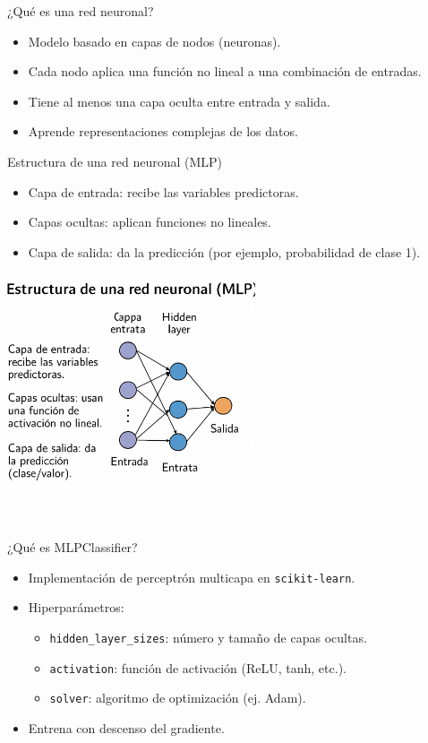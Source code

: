 \documentclass{beamer}
\begin{document}
\begin{frame}{¿Qué es una red neuronal?}
  \begin{itemize}
    \item Modelo basado en capas de nodos (neuronas).
    \item Cada nodo aplica una función no lineal a una combinación de entradas.
    \item Tiene al menos una capa oculta entre entrada y salida.
    \item Aprende representaciones complejas de los datos.
  \end{itemize}
\end{frame}

\begin{frame}{Estructura de una red neuronal (MLP)}
  \begin{itemize}
    \item Capa de entrada: recibe las variables predictoras.
    \item Capas ocultas: aplican funciones no lineales.
    \item Capa de salida: da la predicción (por ejemplo, probabilidad de clase 1).
  \end{itemize}
  \begin{center}
    \includegraphics[width=0.55\textwidth]{mlp_architecture.png}
  \end{center}
\end{frame}

\begin{frame}{¿Qué es MLPClassifier?}
  \begin{itemize}
    \item Implementación de perceptrón multicapa en \texttt{scikit-learn}.
    \item Hiperparámetros:
    \begin{itemize}
      \item \texttt{hidden\_layer\_sizes}: número y tamaño de capas ocultas.
      \item \texttt{activation}: función de activación (ReLU, tanh, etc.).
      \item \texttt{solver}: algoritmo de optimización (ej. Adam).
    \end{itemize}
    \item Entrena con descenso del gradiente.
  \end{itemize}
\end{frame}
\end{document}
